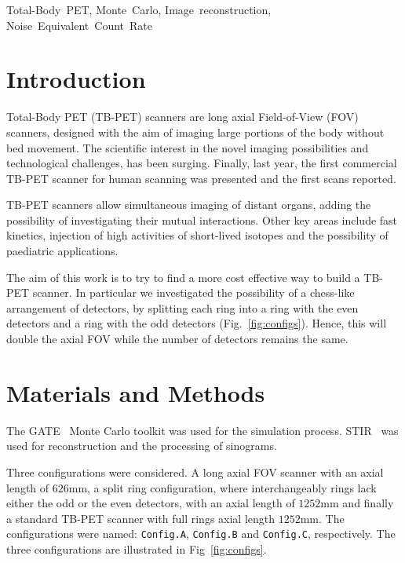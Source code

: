 \documentclass[journal]{IEEEtran}
\begin{document}
\begin{IEEEkeywords}
    Total-Body~PET, Monte~Carlo, Image~reconstruction, Noise~Equivalent~Count~Rate
\end{IEEEkeywords}

\section{Introduction}
Total-Body PET (TB-PET) scanners are long axial Field-of-View (FOV) scanners, designed with the aim of imaging large portions of the body without bed movement\cite{Moskal2016PotentialSystem, Cherry2018Total-BodyCare.}. The scientific interest in the novel imaging possibilities and technological challenges, has been surging. Finally, last year, the first commercial TB-PET scanner for human scanning was presented and the first scans reported\cite{Leung2018PerformanceScanner, Badawi2019FirstScanner.}.

TB-PET scanners allow simultaneous imaging of distant organs, adding the possibility of investigating their mutual interactions. Other key areas include fast kinetics, injection of high activities of short-lived isotopes and the possibility of paediatric applications.

The aim of this work is to try to find a more cost effective way to build a TB-PET scanner.
In particular we investigated the possibility of a chess-like arrangement of detectors, by splitting each ring into a ring with the even detectors and a ring with the odd detectors (Fig.~\ref{fig:configs}). Hence, this will double the axial FOV while the number of detectors remains the same. 

\section{Materials and Methods}
The GATE~\cite{Jan2004} Monte Carlo toolkit was used for the simulation process. STIR~\cite{Thielemans2012P} was used for reconstruction and the processing of sinograms.

Three configurations were considered. A long axial FOV scanner with an axial length of $626$mm, a split ring configuration, where interchangeably rings lack either the odd or the even detectors, with an axial length of $1252$mm and finally a standard TB-PET scanner with full rings axial length $1252$mm. The configurations were named: \texttt{Config.A}, \texttt{Config.B} and \texttt{Config.C}, respectively. The three configurations are illustrated in Fig~\ref{fig:configs}. 
\end{document}
